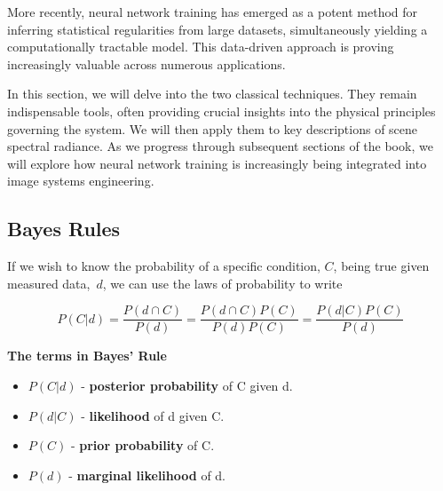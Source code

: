 \documentclass[
  letterpaper,
]{book}
\providecommand{\tightlist}{%
  \setlength{\itemsep}{0pt}\setlength{\parskip}{0pt}}\usepackage{longtable,booktabs,array}
\begin{document}
More recently, neural network training has emerged as a potent method
for inferring statistical regularities from large datasets,
simultaneously yielding a computationally tractable model. This
data-driven approach is proving increasingly valuable across numerous
applications.

In this section, we will delve into the two classical techniques. They
remain indispensable tools, often providing crucial insights into the
physical principles governing the system. We will then apply them to key
descriptions of scene spectral radiance. As we progress through
subsequent sections of the book, we will explore how neural network
training is increasingly being integrated into image systems
engineering.

\subsection{Bayes Rules}\label{bayes-rules}

If we wish to know the probability of a specific condition, \(C\), being
true given measured data,~\(d\), we can use the laws of probability to
write

\[
P(C | d) = \frac{P(d \cap C)}{P(d)} = \frac{P(d \cap C) P(C)}{P(d) P(C)}= \frac{P(d | C) P(C)}{P(d)}
\]

\begin{tcolorbox}[enhanced jigsaw, opacityback=0, breakable, leftrule=.75mm, left=2mm, colframe=quarto-callout-note-color-frame, toprule=.15mm, colback=white, rightrule=.15mm, bottomrule=.15mm, arc=.35mm]
\begin{minipage}[t]{5.5mm}
\textcolor{quarto-callout-note-color}{\faInfo}
\end{minipage}%
\begin{minipage}[t]{\textwidth - 5.5mm}

\vspace{-3mm}\textbf{The terms in Bayes' Rule}\vspace{3mm}

\begin{itemize}
\tightlist
\item
  \(P(C | d)\) - \textbf{posterior probability} of C given d.
\item
  \(P(d|C)\) - \textbf{likelihood} of d given C.
\item
  \(P(C)\) - \textbf{prior probability} of C.
\item
  \(P(d)\) - \textbf{marginal likelihood} of d.
\end{itemize}

\end{minipage}%
\end{tcolorbox}
\end{document}
